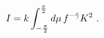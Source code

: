 \begin{equation}
I= k\int^{\pi\over 2}_{-{\pi\over 2}} d\mu \, 
f^{-\tilde{\gamma}}  K^2\ .
\label{angintb}
\end{equation}

